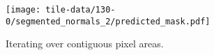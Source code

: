 \begin{figure}[H]
  \centering
  \texttt{[image: tile-data/130-0/segmented\_normals\_2/predicted\_mask.pdf]}
  \caption{Iterating over contiguous pixel areas.}
\end{figure}
